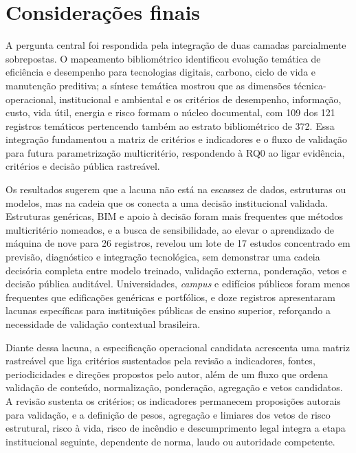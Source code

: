 \section{Considerações finais}
\label{sec:consideracoes}

A pergunta central foi respondida pela integração de duas camadas parcialmente sobrepostas. O mapeamento bibliométrico identificou evolução temática de eficiência e desempenho para tecnologias digitais, carbono, ciclo de vida e manutenção preditiva; a síntese temática mostrou que as dimensões técnica-operacional, institucional e ambiental e os critérios de desempenho, informação, custo, vida útil, energia e risco formam o núcleo documental, com 109 dos 121 registros temáticos pertencendo também ao estrato bibliométrico de 372. Essa integração fundamentou a matriz de critérios e indicadores e o fluxo de validação para futura parametrização multicritério, respondendo à RQ0 ao ligar evidência, critérios e decisão pública rastreável.

Os resultados sugerem que a lacuna não está na escassez de dados, estruturas ou modelos, mas na cadeia que os conecta a uma decisão institucional validada. Estruturas genéricas, BIM e apoio à decisão foram mais frequentes que métodos multicritério nomeados, e a busca de sensibilidade, ao elevar o aprendizado de máquina de nove para 26 registros, revelou um lote de 17 estudos concentrado em previsão, diagnóstico e integração tecnológica, sem demonstrar uma cadeia decisória completa entre modelo treinado, validação externa, ponderação, vetos e decisão pública auditável. Universidades, \textit{campus} e edifícios públicos foram menos frequentes que edificações genéricas e portfólios, e doze registros apresentaram lacunas específicas para instituições públicas de ensino superior, reforçando a necessidade de validação contextual brasileira.

Diante dessa lacuna, a especificação operacional candidata acrescenta uma matriz rastreável que liga critérios sustentados pela revisão a indicadores, fontes, periodicidades e direções propostos pelo autor, além de um fluxo que ordena validação de conteúdo, normalização, ponderação, agregação e vetos candidatos. A revisão sustenta os critérios; os indicadores permanecem proposições autorais para validação, e a definição de pesos, agregação e limiares dos vetos de risco estrutural, risco à vida, risco de incêndio e descumprimento legal integra a etapa institucional seguinte, dependente de norma, laudo ou autoridade competente.

